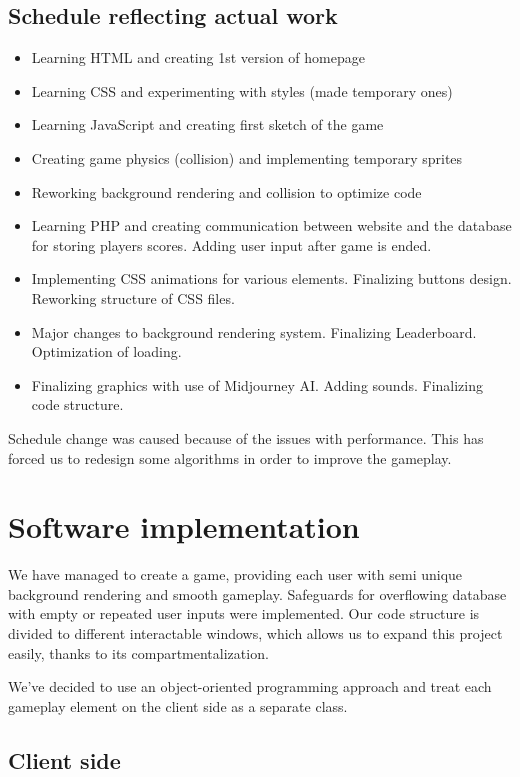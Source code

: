 \documentclass[oneside,a4paper,11pt]{report}
\begin{document}
\section{Schedule reflecting actual work}
\begin{itemize}
	\item Learning HTML and creating 1st version of homepage
	\item Learning CSS and experimenting with styles (made temporary ones)
	\item Learning JavaScript and creating first sketch of the game
	\item Creating game physics (collision) and implementing temporary sprites
	\item Reworking background rendering and collision to optimize code
	\item Learning PHP and creating communication between website and the database for storing players scores. Adding user input after game is ended.
	\item Implementing CSS animations for various elements. Finalizing buttons design. Reworking structure of CSS files.
	\item Major changes to background rendering system. Finalizing Leaderboard. Optimization of loading.
	\item Finalizing graphics with use of Midjourney AI. Adding sounds. Finalizing code structure.
\end{itemize}

\noindent
Schedule change was caused because of the issues with performance. This has forced us to redesign some algorithms in order to improve the gameplay.

\chapter{Software implementation}

We have managed to create a game, providing each user with semi unique background rendering and smooth gameplay.
Safeguards for overflowing database with empty or repeated user inputs were implemented.
Our code structure is divided to different interactable windows, which allows us to expand this project easily, thanks to its compartmentalization.

\par
We've decided to use an object-oriented programming approach and treat each gameplay element on the client side as a separate class.

\section{Client side}
\end{document}
